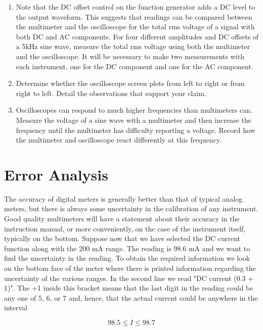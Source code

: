 \begin{enumerate}
\item Note that the DC offset control on the function generator adds a DC level to the output waveform. This suggests that readings can be compared between the multimeter and the oscilloscope for the total rms voltage of a signal with both DC and AC components. For four different amplitudes and DC offsets of a 5kHz sine wave, measure the total rms voltage using both the multimeter and the oscilloscope. It will be necessary to make two measurements with each instrument, one for the DC component and one for the AC component.

\item Determine whether the oscilloscope screen plots from left to right or from right to left. Detail the observations that support your claim.

\item Oscilloscopes can respond to much higher frequencies than multimeters can. Measure the voltage of a sine wave with a multimeter and then increase the frequency until the multimeter has difficulty reporting a voltage. Record how the multimeter and oscilloscope react differently at this frequency.
\end{enumerate}


\section{{\bf Error Analysis}}

The accuracy of digital meters is generally better than that of typical analog meters, but there is always some uncertainty in the calibration of any instrument. Good quality multimeters will have a statement about their accuracy in the instruction manual, or more conveniently, on the case of the instrument itself, typically on the bottom. Suppose now that we have selected the DC current function along with the 200 mA range. The reading is 98.6 mA and we want to find the uncertainty in the reading. To obtain the required information we look on the bottom face of the meter where there is printed information regarding the uncertainty of the various ranges. In the second line we read "DC current  (0.3 + 1)". The +1 inside this bracket means that the last digit in the reading could be any one of 5, 6, or 7 and, hence, that the actual current could be anywhere in the interval

\begin{equation}
98.5\leq I \leq 98.7
\label{equ:ac9}
\end{equation}

